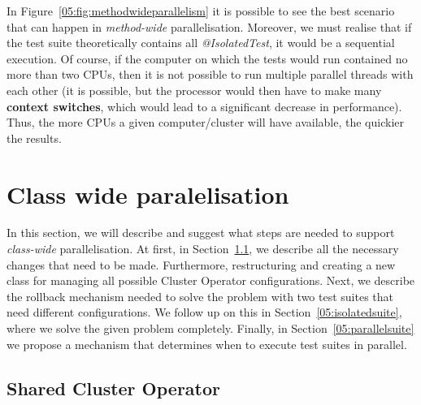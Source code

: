 In Figure~\ref {05:fig:methodwideparallelism} it is possible to see the best scenario that can happen in \emph {method-wide} parallelisation.
Moreover, we must realise that if the test suite theoretically contains all \emph{@IsolatedTest}, it would be a sequential execution.
Of course, if the computer on which the tests would run contained no more than two CPUs, then it is not possible to run multiple parallel threads with each other (it is possible, but the processor would then have to make many \textbf{context switches}, which would lead to a significant decrease in performance).
Thus, the more CPUs a given computer/cluster will have available, the quickier the results.

\section{Class wide paralelisation}
\label{04:classwideparalelisation}

In this section, we will describe and suggest what steps are needed to support \emph{class-wide} parallelisation.
At first, in Section~\ref{05:sharedclusteroperator}, we describe all the necessary changes that need to be made.
Furthermore, restructuring and creating a new class for managing all possible Cluster Operator configurations.
Next, we describe the rollback mechanism needed to solve the problem with two test suites that need different configurations.
We follow up on this in Section~\ref{05:isolatedsuite}, where we solve the given problem completely.
Finally, in Section~\ref{05:parallelsuite} we propose a mechanism that determines when to execute test suites in parallel.

\subsection{Shared Cluster Operator}
\label{05:sharedclusteroperator}

